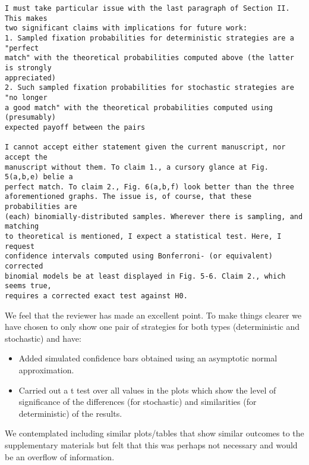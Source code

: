 \documentclass[a4]{article}
\begin{document}
\begin{verbatim}
I must take particular issue with the last paragraph of Section II. This makes
two significant claims with implications for future work:
1. Sampled fixation probabilities for deterministic strategies are a "perfect
match" with the theoretical probabilities computed above (the latter is strongly
appreciated)
2. Such sampled fixation probabilities for stochastic strategies are "no longer
a good match" with the theoretical probabilities computed using (presumably)
expected payoff between the pairs

I cannot accept either statement given the current manuscript, nor accept the
manuscript without them. To claim 1., a cursory glance at Fig. 5(a,b,e) belie a
perfect match. To claim 2., Fig. 6(a,b,f) look better than the three
aforementioned graphs. The issue is, of course, that these probabilities are
(each) binomially-distributed samples. Wherever there is sampling, and matching
to theoretical is mentioned, I expect a statistical test. Here, I request
confidence intervals computed using Bonferroni- (or equivalent) corrected
binomial models be at least displayed in Fig. 5-6. Claim 2., which seems true,
requires a corrected exact test against H0.
\end{verbatim}

We feel that the reviewer has made an excellent point. To make things clearer we
have chosen to only show one pair of strategies for both types (deterministic
and stochastic) and have:

\begin{itemize}
    \item Added simulated confidence bars obtained using an asymptotic normal
        approximation.
    \item Carried out a t test over all values in the plots which show the level
        of significance of the differences (for stochastic) and similarities
        (for deterministic) of the results.
\end{itemize}

We contemplated including similar plots/tables that show similar outcomes to the
supplementary materials but felt that this was perhaps not necessary and would
be an overflow of information.
\end{document}
